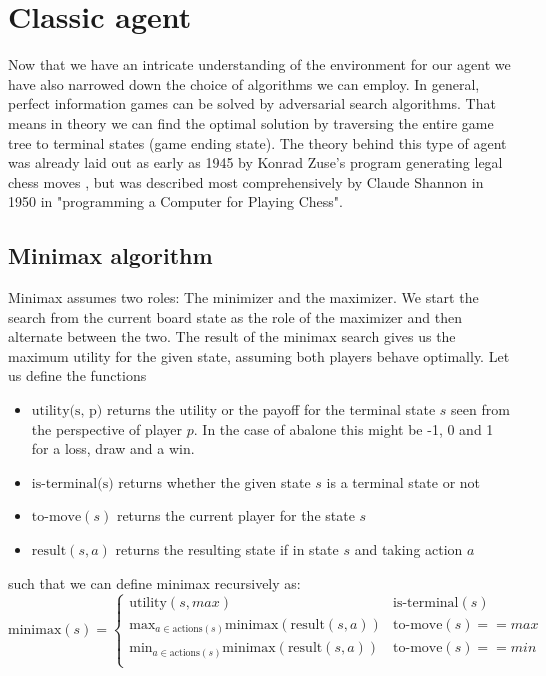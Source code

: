 \section{Classic agent}
Now that we have an intricate understanding of the environment for our agent we have also narrowed down the choice of algorithms we can employ. In general, perfect information games can be solved by adversarial search algorithms. That means in theory we can find the optimal solution by traversing the entire game tree to terminal states (game ending state). The theory behind this type of agent was already laid out as early as 1945 by Konrad Zuse's program generating legal chess moves \cite{knuth_early_1980}, but was described most comprehensively by Claude Shannon in 1950 in "programming a Computer for Playing Chess". \cite{shannon_xxii_1950}

\subsection{Minimax algorithm}
Minimax assumes two roles: The minimizer and the maximizer. We start the search from the current board state as the role of the maximizer and then alternate between the two. The result of the minimax search gives us the maximum utility for the given state, assuming both players behave optimally. Let us define the functions
\begin{itemize}
    \item $\text{utility(s, p)}$ returns the utility or the payoff for the terminal state $s$ seen from the perspective of player $p$. In the case of abalone this might be -1, 0 and 1 for a loss, draw and a win.
    \item $\text{is-terminal(s)}$ returns whether the given state $s$ is a terminal state or not
    \item $\text{to-move}(s)$ returns the current player for the state $s$
    \item $\text{result}(s, a)$ returns the resulting state if in state $s$ and taking action $a$
\end{itemize}
such that we can define minimax recursively as:
$$
    \text{minimax}(s) =
    \begin{cases}
        \text{utility}(s, max)                                                & \text{is-terminal}(s)    \\
        \text{max}_{a\in\text{actions}(s)}\text{minimax}(\text{result}(s, a)) & \text{to-move}(s) == max \\
        \text{min}_{a\in\text{actions}(s)}\text{minimax}(\text{result}(s, a)) & \text{to-move}(s) == min \\
    \end{cases}
$$

